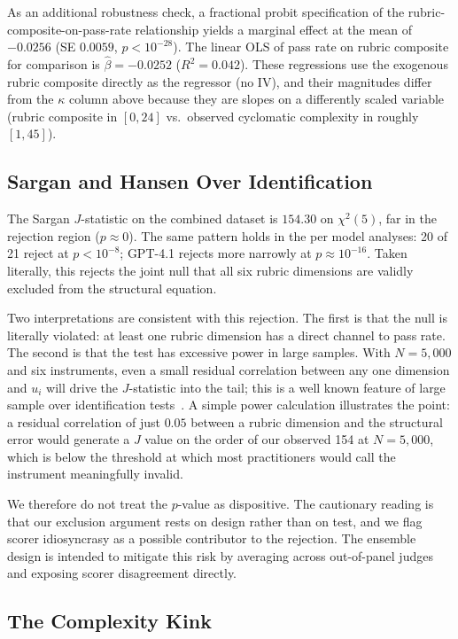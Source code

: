 \documentclass{article}
\begin{document}
As an additional robustness check, a fractional probit specification of the rubric-composite-on-pass-rate relationship yields a marginal effect at the mean of $-0.0256$ (SE $0.0059$, $p<10^{-28}$). The linear OLS of pass rate on rubric composite for comparison is $\hat{\beta}=-0.0252$ ($R^2=0.042$). These regressions use the exogenous rubric composite directly as the regressor (no IV), and their magnitudes differ from the $\kappa$ column above because they are slopes on a differently scaled variable (rubric composite in $[0,24]$ vs.\ observed cyclomatic complexity in roughly $[1,45]$).

\subsection{Sargan and Hansen Over Identification}

The Sargan $J$-statistic on the combined dataset is $154.30$ on $\chi^2(5)$, far in the rejection region ($p\approx 0$). The same pattern holds in the per model analyses: 20 of 21 reject at $p<10^{-8}$; GPT-4.1 rejects more narrowly at $p\approx 10^{-16}$. Taken literally, this rejects the joint null that all six rubric dimensions are validly excluded from the structural equation.

Two interpretations are consistent with this rejection. The first is that the null is literally violated: at least one rubric dimension has a direct channel to pass rate. The second is that the test has excessive power in large samples. With $N=5{,}000$ and six instruments, even a small residual correlation between any one dimension and $u_i$ will drive the $J$-statistic into the tail; this is a well known feature of large sample over identification tests~\cite{bowsher2002reject}. A simple power calculation illustrates the point: a residual correlation of just $0.05$ between a rubric dimension and the structural error would generate a $J$ value on the order of our observed 154 at $N=5{,}000$, which is below the threshold at which most practitioners would call the instrument meaningfully invalid.

We therefore do not treat the $p$-value as dispositive. The cautionary reading is that our exclusion argument rests on design rather than on test, and we flag scorer idiosyncrasy as a possible contributor to the rejection. The ensemble design is intended to mitigate this risk by averaging across out-of-panel judges and exposing scorer disagreement directly.


\subsection{The Complexity Kink}
\end{document}
